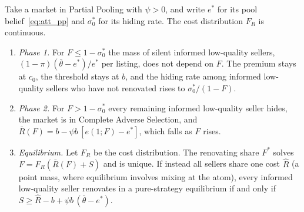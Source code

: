 \label{prop:subsidy_ge}
Take a market in Partial Pooling with $\psi>0$, and write $e^*$ for its pool belief~\eqref{eq:att_pp} and $\sigma_0^*$ for its hiding rate. The cost distribution $F_R$ is continuous.
\begin{enumerate}[label=(\roman*)]
    \item \emph{Phase 1.} For $F\le1-\sigma_0^*$ the mass of silent informed low-quality sellers, $(1-\pi)(\bar\theta-e^*)/e^*$ per listing, does not depend on $F$. The premium stays at $c_0$, the threshold stays at $b$, and the hiding rate among informed low-quality sellers who have not renovated rises to $\sigma_0^*/(1-F)$.
    \item \emph{Phase 2.} For $F>1-\sigma_0^*$ every remaining informed low-quality seller hides, the market is in Complete Adverse Selection, and $\bar R(F)=b-\psi b\,[e(1;F)-e^*]$, which falls as $F$ rises.
    \item \emph{Equilibrium.} Let $F_R$ be the cost distribution. The renovating share $F^*$ solves $F=F_R(\bar R(F)+S)$ and is unique. If instead all sellers share one cost $\hat R$ (a point mass, where equilibrium involves mixing at the atom), every informed low-quality seller renovates in a pure-strategy equilibrium if and only if $S\ge\hat R-b+\psi b\,(\bar\theta-e^*)$.
\end{enumerate}

